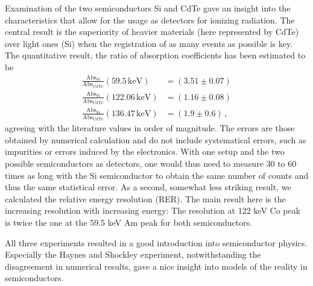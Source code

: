 Examination of the two semiconductors Si and CdTe gave an insight into the 
characteristics that allow for the usage as detectors for ionizing 
radiation. The central result is the superiority of heavier materials
(here represented by CdTe) over light ones (Si) when the registration of as 
many events as possible is key. The quantitative result, 
the ratio of absorption coefficients has been estimated to be
\begin{align}
    \mathrm{\frac{Abs_{Si}}{Abs_{CdTe}}}(59.5\, \mathrm{keV}) &= (3.51 \pm 0.07) \\
    \mathrm{\frac{Abs_{Si}}{Abs_{CdTe}}}(122.06\, \mathrm{keV}) &= (1.16 \pm 0.08)\\ 
    \mathrm{\frac{Abs_{Si}}{Abs_{CdTe}}}(136.47\, \mathrm{keV}) &= (1.9 \pm 0.6) \, ,
\end{align}
agreeing with the literature values in order of magnitude. The errors 
are those obtained by numerical calculation and do not include 
systematical errors, such as impurities or errors induced by the electronics. 
With one setup and the two possible semiconductors as detectors, one 
would thus need to measure 30 to 60 times as long with the Si semiconductor 
to obtain the same number of counts and thus the same statistical error. 
As a second, somewhat less striking result, we calculated the 
relative energy resolution (RER). The main result here is the increasing 
resolution with increasing energy: The resolution at 122 keV Co peak is 
twice the one at the 59.5 keV Am peak for both semiconductors.  

All three experiments resulted in a good introduction into semiconductor physics. 
Especially the Haynes and Shockley experiment, notwithstanding the disagreement in 
numerical results, gave a nice insight into models of the reality in semiconductors. 

